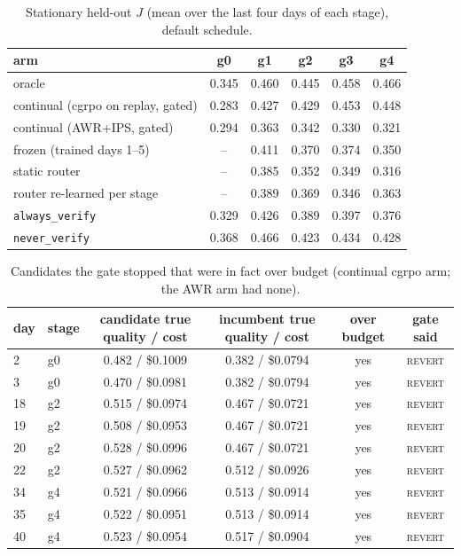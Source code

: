 \documentclass[10pt]{article}
\newcommand{\code}[1]{\texttt{#1}}
\newcommand{\REVERT}{\textsc{revert}}
\begin{document}
\begin{table}[H]
\centering\footnotesize
\caption{Stationary held-out $J$ (mean over the last four days of each stage), default schedule.}
\begin{tabular}{lccccc}
\toprule
arm & g0 & g1 & g2 & g3 & g4 \\
\midrule
oracle & 0.345 & 0.460 & 0.445 & 0.458 & 0.466 \\
continual (cgrpo on replay, gated) & 0.283 & 0.427 & 0.429 & 0.453 & 0.448 \\
continual (AWR+IPS, gated) & 0.294 & 0.363 & 0.342 & 0.330 & 0.321 \\
frozen (trained days 1--5) & -- & 0.411 & 0.370 & 0.374 & 0.350 \\
static router & -- & 0.385 & 0.352 & 0.349 & 0.316 \\
router re-learned per stage & -- & 0.389 & 0.369 & 0.346 & 0.363 \\
\code{always\_verify} & 0.329 & 0.426 & 0.389 & 0.397 & 0.376 \\
\code{never\_verify} & 0.368 & 0.466 & 0.423 & 0.434 & 0.428 \\
\bottomrule
\end{tabular}
\end{table}

\begin{table}[H]
\centering\footnotesize
\caption{Candidates the gate stopped that were in fact over budget (continual cgrpo arm; the AWR arm had none).}
\begin{tabular}{llcccc}
\toprule
day & stage & candidate true quality / cost & incumbent true quality / cost & over budget & gate said \\
\midrule
2 & g0 & 0.482 / \$0.1009 & 0.382 / \$0.0794 & yes & \REVERT \\
3 & g0 & 0.470 / \$0.0981 & 0.382 / \$0.0794 & yes & \REVERT \\
18 & g2 & 0.515 / \$0.0974 & 0.467 / \$0.0721 & yes & \REVERT \\
19 & g2 & 0.508 / \$0.0953 & 0.467 / \$0.0721 & yes & \REVERT \\
20 & g2 & 0.528 / \$0.0996 & 0.467 / \$0.0721 & yes & \REVERT \\
22 & g2 & 0.527 / \$0.0962 & 0.512 / \$0.0926 & yes & \REVERT \\
34 & g4 & 0.521 / \$0.0966 & 0.513 / \$0.0914 & yes & \REVERT \\
35 & g4 & 0.522 / \$0.0951 & 0.513 / \$0.0914 & yes & \REVERT \\
40 & g4 & 0.523 / \$0.0954 & 0.517 / \$0.0904 & yes & \REVERT \\
\bottomrule
\end{tabular}
\end{table}
\end{document}
